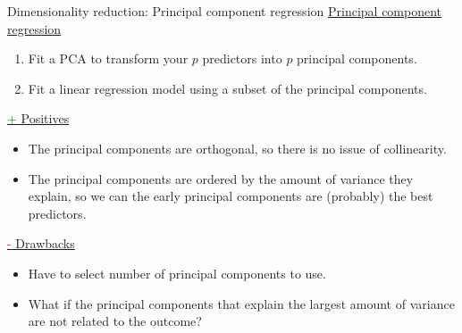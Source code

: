 \documentclass[8pt]{beamer}
\begin{document}
    \begin{frame}{Dimensionality reduction: Principal component regression} %
        \underline{Principal component regression}
        \begin{enumerate}
            \item Fit a PCA to transform your $p$ predictors into $p$ principal components.
            \item Fit a linear regression model using a subset of the principal components.
        \end{enumerate}
        \vspace{0.25cm}
        \underline{\textcolor{green}{+} Positives}\\
        \begin{itemize}
            \item The principal components are orthogonal, so there is no issue of collinearity.\\
            \item The principal components are ordered by the amount of variance they explain, so we can the early principal components are (probably) the best predictors.
        \end{itemize}
        \vspace{0.25cm}
        \underline{\textcolor{red}{-} Drawbacks}\\
        \begin{itemize}
            \item Have to select number of principal components to use.
            \item What if the principal components that explain the largest amount of variance are not related to the outcome?
        \end{itemize}
    \end{frame}
\end{document}
